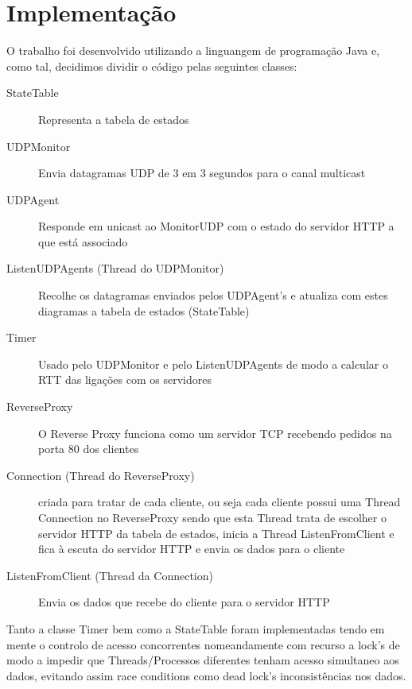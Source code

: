 \documentclass{article}
\begin{document}
\section{Implementação}
O trabalho foi desenvolvido utilizando a linguangem de programação Java e, como tal, decidimos dividir o código pelas seguintes classes:
\begin{description}
    \item [StateTable] Representa a tabela de estados
    \item [UDPMonitor] Envia datagramas UDP de 3 em 3 segundos para o canal multicast 
    \item [UDPAgent] Responde em unicast ao MonitorUDP com o estado do servidor HTTP a que está associado
    \item [ListenUDPAgents (Thread do UDPMonitor)] Recolhe os datagramas enviados pelos UDPAgent's e atualiza com estes diagramas a tabela de estados (StateTable)
    \item [Timer] Usado pelo UDPMonitor e pelo ListenUDPAgents de modo a calcular o RTT das ligações com os servidores
    \item [ReverseProxy] O Reverse Proxy funciona como um servidor TCP recebendo pedidos na porta 80 dos clientes
    \item [Connection (Thread do ReverseProxy)] criada para tratar de cada cliente, ou seja cada cliente possui uma Thread Connection no ReverseProxy sendo que esta Thread trata de escolher o servidor HTTP da tabela de estados, inicia a Thread ListenFromClient e fica à escuta do servidor HTTP e envia os dados para o cliente
    \item [ListenFromClient (Thread da Connection)] Envia os dados que recebe do cliente para o servidor HTTP
\end{description}

Tanto a classe Timer bem como a StateTable foram implementadas tendo em mente o controlo de acesso concorrentes nomeandamente com recurso a lock's de modo a impedir que Threads/Processos diferentes tenham acesso simultaneo aos dados, evitando assim race conditions como dead lock's inconsistências nos dados.
\end{document}
